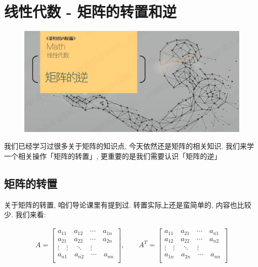 \chapter{线性代数 - 矩阵的转置和逆}

\begin{figure}[ht]
  \centering
  \includegraphics[width=1\linewidth]{asset/茶桁的AI秘籍_Math_17.png}
\end{figure}

\newpage

我们已经学习过很多关于矩阵的知识点, 今天依然还是矩阵的相关知识. 我们来学一个相关操作「矩阵的转置」, 更重要的是我们需要认识「矩阵的逆」

\section{矩阵的转置}

关于矩阵的转置, 咱们导论课里有提到过. 转置实际上还是蛮简单的, 内容也比较少. 我们来看: 

\begin{align*}
  A = \begin{bmatrix}
  a_{11} \quad a_{12} \quad \cdots \quad a_{1n} \\
  a_{21} \quad a_{22} \quad \cdots \quad a_{2n} \\
  \vdots \quad \vdots \quad \ddots \quad \vdots \\
  a_{n1} \quad a_{n2} \quad \cdots \quad a_{nn} \\
  \end{bmatrix}, \qquad 
  A^T = \begin{bmatrix}
  a_{11} \quad a_{21} \quad \cdots \quad a_{n1} \\
  a_{12} \quad a_{22} \quad \cdots \quad a_{n2} \\
  \vdots \quad \vdots \quad \ddots \quad \vdots \\
  a_{1n} \quad a_{2n} \quad \cdots \quad a_{nn} \\
  \end{bmatrix}
\end{align*}

